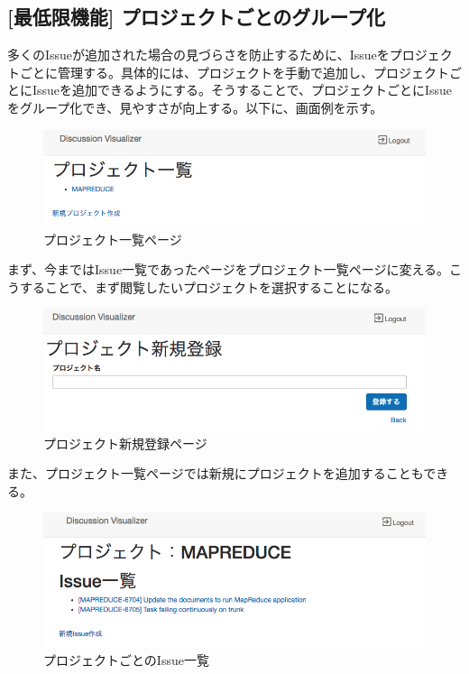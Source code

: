 \documentclass[12pt, oneside]{jreport}
\begin{document}
		\subsection{[最低限機能] プロジェクトごとのグループ化}
		多くのIssueが追加された場合の見づらさを防止するために、Issueをプロジェクトごとに管理する。具体的には、プロジェクトを手動で追加し、プロジェクトごとにIssueを追加できるようにする。そうすることで、プロジェクトごとにIssueをグループ化でき、見やすさが向上する。以下に、画面例を示す。
		
		\begin{figure}[H]
		\centering
		\includegraphics[width=17cm,bb=700 300 -200 27]{ProjectList.png}
		\caption{プロジェクト一覧ページ}
		\end{figure}
		
		まず、今まではIssue一覧であったページをプロジェクト一覧ページに変える。こうすることで、まず閲覧したいプロジェクトを選択することになる。
			
		\begin{figure}[H]
		\centering
		\includegraphics[width=17cm,bb=500 300 -200 27]{ProjectAdd.png}
		\caption{プロジェクト新規登録ページ}
		\end{figure}
		
		また、プロジェクト一覧ページでは新規にプロジェクトを追加することもできる。
		
		\begin{figure}[H]
		\centering
		\includegraphics[width=17cm,bb=500 300 -200 27]{ProjectIssueList.png}
		\caption{プロジェクトごとのIssue一覧}
		\end{figure}
		
\end{document}
